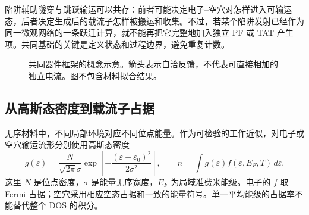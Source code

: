 {\cjkfont 陷阱辅助隧穿与跳跃输运可以共存：前者可能决定电子}\allowbreak{}--{\cjkfont 空穴对怎样进入可输运态，后者决定生成后的载流子怎样被搬运和收集。不过，若某个陷阱发射已经作为同一微观网络的一条跃迁计算，就不能再把它完整地加入独立}\allowbreak{} PF {\cjkfont 或}\allowbreak{} TAT {\cjkfont 产生项。共同基础的关键是定义状态和过程边界，避免重复计数。}\allowbreak{}

\begin{figure}[htbp]\centering
{}
\caption{{\cjkfont 共同器件框架的概念示意。箭头表示自洽反馈，不代表可直接相加的独立电流。图不包含材料拟合结果。}\allowbreak{}}\label{fig:common-framework}
\end{figure}

\subsection{{\cjkfont 从高斯态密度到载流子占据}\allowbreak{}}
{\cjkfont 无序材料中，不同局部环境对应不同位点能量。作为可检验的工作近似，对电子或空穴输运流形分别使用高斯态密度}\allowbreak{}
\begin{equation}
 g(\varepsilon)=\frac{N}{\sqrt{2\pi}\sigma}\exp\!\left[-\frac{(\varepsilon-\varepsilon_0)^2}{2\sigma^2}\right],\qquad
 n=\int g(\varepsilon)f(\varepsilon,E_F,T)\,d\varepsilon .
\end{equation}
{\cjkfont 这里}\allowbreak{} $N$ {\cjkfont 是位点密度，}\allowbreak{}$\sigma$ {\cjkfont 是能量无序宽度，}\allowbreak{}$E_F$ {\cjkfont 为局域准费米能级。电子的}\allowbreak{} $f$ {\cjkfont 取}\allowbreak{} Fermi {\cjkfont 占据；空穴采用相应空态占据和一致的能量符号。单一平均能级的占据率不能替代整个}\allowbreak{} DOS {\cjkfont 的积分。}\allowbreak{}

